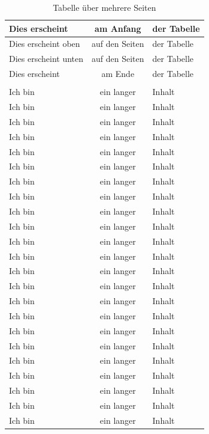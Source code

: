 \documentclass[
12pt,
ngerman
]{scrreprt}
\begin{document}
\begin{longtable}{lcl}
  \toprule
  Dies erscheint & am Anfang & der Tabelle \\
  \bottomrule
  \endfirsthead
  \midrule
  Dies erscheint oben & auf den Seiten & der Tabelle \\
  \midrule
  \endhead
  \midrule
  Dies erscheint unten & auf den Seiten & der Tabelle \\
  \midrule
  \endfoot
  \toprule
  Dies erscheint & am Ende & der Tabelle \\
  \bottomrule
  \caption[Aufgabe 2 - Tabelle über mehrere Seiten]{Tabelle über mehrere Seiten} \\
  \endlastfoot
  \label{tab:longtable}
  Ich bin & ein langer & Inhalt \\
  Ich bin & ein langer & Inhalt \\
  Ich bin & ein langer & Inhalt \\
  Ich bin & ein langer & Inhalt \\
  Ich bin & ein langer & Inhalt \\
  Ich bin & ein langer & Inhalt \\
  Ich bin & ein langer & Inhalt \\
  Ich bin & ein langer & Inhalt \\
  Ich bin & ein langer & Inhalt \\
  Ich bin & ein langer & Inhalt \\
  Ich bin & ein langer & Inhalt \\
  Ich bin & ein langer & Inhalt \\
  Ich bin & ein langer & Inhalt \\
  Ich bin & ein langer & Inhalt \\
  Ich bin & ein langer & Inhalt \\
  Ich bin & ein langer & Inhalt \\
  Ich bin & ein langer & Inhalt \\
  Ich bin & ein langer & Inhalt \\
  Ich bin & ein langer & Inhalt \\
  Ich bin & ein langer & Inhalt \\
  Ich bin & ein langer & Inhalt \\
  Ich bin & ein langer & Inhalt \\
  Ich bin & ein langer & Inhalt \\

\end{longtable}
\end{document}
